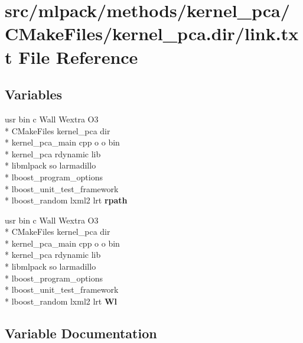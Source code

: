 \section{src/mlpack/methods/kernel\-\_\-pca/\-C\-Make\-Files/kernel\-\_\-pca.dir/link.txt File Reference}
\label{methods_2kernel__pca_2CMakeFiles_2kernel__pca_8dir_2link_8txt}
\subsection*{Variables}
\begin{DoxyCompactItemize}
\item 
usr bin c Wall Wextra O3 \\*
C\-Make\-Files kernel\-\_\-pca dir \\*
kernel\-\_\-pca\-\_\-main cpp o o bin \\*
kernel\-\_\-pca rdynamic lib \\*
libmlpack so larmadillo \\*
lboost\-\_\-program\-\_\-options \\*
lboost\-\_\-unit\-\_\-test\-\_\-framework \\*
lboost\-\_\-random lxml2 lrt {\bf rpath}
\item 
usr bin c Wall Wextra O3 \\*
C\-Make\-Files kernel\-\_\-pca dir \\*
kernel\-\_\-pca\-\_\-main cpp o o bin \\*
kernel\-\_\-pca rdynamic lib \\*
libmlpack so larmadillo \\*
lboost\-\_\-program\-\_\-options \\*
lboost\-\_\-unit\-\_\-test\-\_\-framework \\*
lboost\-\_\-random lxml2 lrt {\bf Wl}
\end{DoxyCompactItemize}


\subsection{Variable Documentation}
